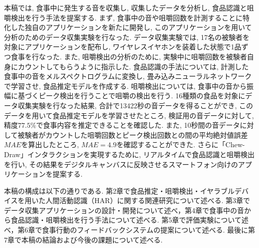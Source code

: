 本稿では, 食事中に発生する音を収集し, 収集したデータを分析し, 食品認識と咀嚼検出を行う手法を提案する. まず, 食事中の音や咀嚼回数を計測することに特化した独自のアプリケーションを新たに開発し, このアプリケーションを用いて分析のためのデータ収集実験を行なった. データ収集実験では, 17名の被験者を対象にアプリケーションを配布し, ワイヤレスイヤホンを装着した状態で1品ずつ食事を行なった. また, 咀嚼検出の分析のために, 実験中に咀嚼回数を被験者自身にカウントしてもらうように指示した. 食品認識の手法については, 計測した食事中の音をメルスペクトログラムに変換し, 畳み込みニューラルネットワークで学習させ, 食品推定モデルを作成する. 咀嚼検出については, 食事中の音から振幅に基づくピーク検出を行うことで咀嚼の検出を行う. 16種類の食品を対象にデータ収集実験を行なった結果, 合計で13422秒の音データを得ることができ, このデータを用いて食品推定モデルを学習させたところ, 検証用の音データに対して, 精度$77.5\%$で食事内容を推定できることを確認した. また, 10秒間の音データに対して被験者がカウントした咀嚼回数とピーク検出回数との間の平均絶対値誤差$MAE$を算出したところ, $MAE = 4.9$を確認することができた. さらに「Chew-Draw」インタラクションを実現するために, リアルタイムで食品認識と咀嚼検出を行い, その結果をデジタルキャンバスに反映させるスマートフォン向けのアプリケーションを提案する.

本稿の構成は以下の通りである.
第2章で食品推定・咀嚼検出・イヤラブルデバイスを用いた人間活動認識（HAR）に関する関連研究について述べる. 第3章でデータ収集アプリケーションの設計・開発について述べ，第4章で食事中の音から食品認識・咀嚼検出を行う手法について述べる. 第5章で評価実験について述べ，第6章で食事行動のフィードバックシステムの提案について述べる. 最後に第7章で本稿の結論および今後の課題について述べる.

